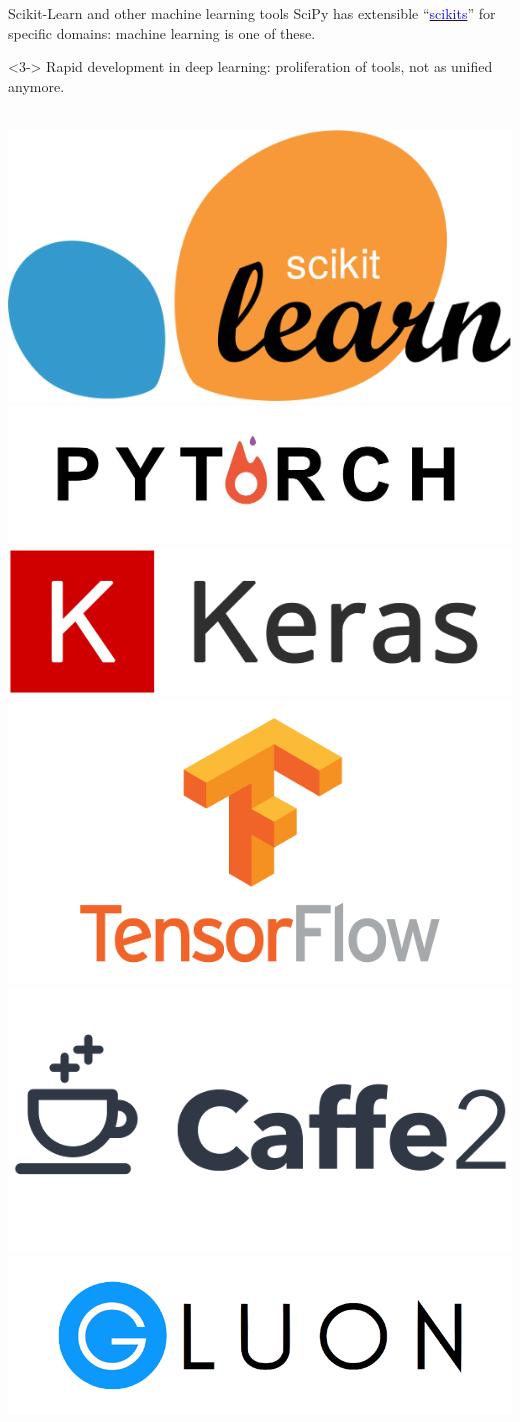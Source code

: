 \documentclass[aspectratio=169]{beamer}
\begin{document}
\begin{frame}{Scikit-Learn and other machine learning tools}
\vspace{0.5 cm}
SciPy has extensible ``\href{https://www.scipy.org/scikits.html}{\textcolor{blue}{scikits}}'' for specific domains: machine learning is one of these.

\vspace{0.25 cm}

\vspace{0.25 cm}
\begin{uncoverenv}<3->
Rapid development in deep learning: proliferation of tools, not as unified anymore.

\vspace{0.15 cm}
\mbox{ } \includegraphics[height=0.8 cm]{sklearn-logo.png}
\hfill \includegraphics[height=0.8 cm]{pytorch-logo.png}
\hfill \includegraphics[height=0.8 cm]{keras-logo.png}
\hfill \includegraphics[height=1 cm]{tensorflow-logo.png}
\hfill \includegraphics[height=0.8 cm]{caffe2-logo.png}
\hfill \includegraphics[height=0.8 cm]{gluon-logo.png} \mbox{ }


\end{uncoverenv}
\end{frame}
\end{document}
